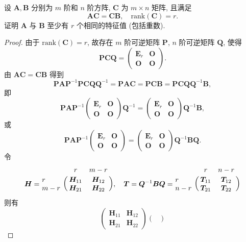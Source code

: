 \documentclass[../../main.tex]{subfiles}%
\begin{document}
\begin{example}
设 $\boldsymbol{A},\boldsymbol{B}$ 分别为 $m$ 阶和 $n$ 阶方阵, $\boldsymbol{C}$ 为 $m \times n$ 矩阵, 且满足
\[
\boldsymbol{AC} = \boldsymbol{CB}, \quad \mathrm{rank}(\boldsymbol{C}) = r.
\]
证明 $\boldsymbol{A}$ 与 $\boldsymbol{B}$ 至少有 $r$ 个相同的特征值 (包括重数).
\end{example}
\begin{proof}
由于 $\mathrm{rank}(\boldsymbol{C}) = r$, 故存在 $m$ 阶可逆矩阵 $\boldsymbol{P}$, $n$ 阶可逆矩阵 $\boldsymbol{Q}$, 使得
\[
\boldsymbol{PCQ} = \begin{pmatrix} 
\boldsymbol{E}_r & \boldsymbol{O} \\
\boldsymbol{O} & \boldsymbol{O} 
\end{pmatrix}.
\]
由 $\boldsymbol{AC} = \boldsymbol{CB}$ 得到
\[
\boldsymbol{PAP}^{-1}\boldsymbol{PCQQ}^{-1} = \boldsymbol{PAC} = \boldsymbol{PCB} = \boldsymbol{PCQQ}^{-1}\boldsymbol{B},
\]
即
\[
\boldsymbol{PAP}^{-1} \begin{pmatrix} 
\boldsymbol{E}_r & \boldsymbol{O} \\
\boldsymbol{O} & \boldsymbol{O} 
\end{pmatrix} \boldsymbol{Q}^{-1} = \begin{pmatrix} 
\boldsymbol{E}_r & \boldsymbol{O} \\
\boldsymbol{O} & \boldsymbol{O} 
\end{pmatrix} \boldsymbol{Q}^{-1}\boldsymbol{B},
\]
或
\[
\boldsymbol{PAP}^{-1} \begin{pmatrix} 
\boldsymbol{E}_r & \boldsymbol{O} \\
\boldsymbol{O} & \boldsymbol{O} 
\end{pmatrix} = \begin{pmatrix} 
\boldsymbol{E}_r & \boldsymbol{O} \\
\boldsymbol{O} & \boldsymbol{O} 
\end{pmatrix} \boldsymbol{Q}^{-1}\boldsymbol{BQ}.
\]
令
\[
\boldsymbol{H} = \bordermatrix{%
& r & m-r \cr
r & \boldsymbol{H}_{11}& \boldsymbol{H}_{12}  \cr
m-r & \boldsymbol{H}_{21}& \boldsymbol{H}_{22}  \cr
}, \quad \boldsymbol{T} = \boldsymbol{Q}^{-1}\boldsymbol{BQ} = \bordermatrix{%
& r & n-r \cr
r & \boldsymbol{T}_{11}& \boldsymbol{T}_{12}  \cr
n-r & \boldsymbol{T}_{21}& \boldsymbol{T}_{22}  \cr
}
\]
则有
\[
\begin{pmatrix} 
\boldsymbol{H}_{11} & \boldsymbol{H}_{12} \\
\boldsymbol{H}_{21} & \boldsymbol{H}_{22} 
\end{pmatrix} \begin{pmatrix} 

\end{pmatrix}\]
\end{proof}
\end{document}

